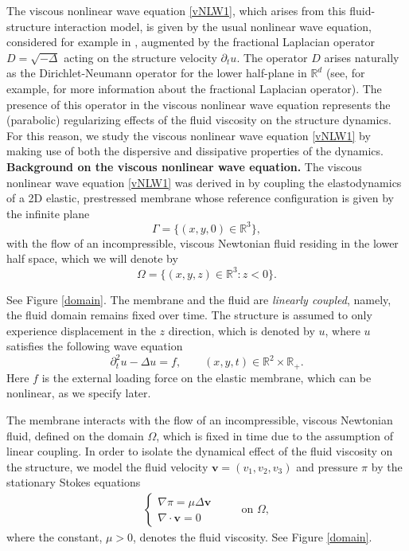 \documentclass[letterpaper, 11pt,  reqno]{amsart}
\newcommand{\1}{\hspace{0.5mm}\text{I}\hspace{0.2mm}}
\newcommand{\noi}{\noindent}
\numberwithin{equation}{section}
\numberwithin{theorem}{section}
\begin{document}
The viscous nonlinear wave equation \eqref{vNLW1}, which arises from this fluid-structure interaction model, is given by the usual nonlinear wave equation, considered for example in \cite{TAO}, augmented by the fractional Laplacian operator $D = \sqrt{-\Delta}$ acting on the structure velocity $\partial_{t}u$. The operator $D$ arises naturally as the Dirichlet-Neumann operator for the lower half-plane in $\mathbb{R}^{d}$ (see, for example, \cite{CS} for more information about the fractional Laplacian operator). The presence of this operator in the viscous nonlinear wave equation represents 
the (parabolic) regularizing effects of the fluid viscosity on the structure dynamics. 
For this reason, we study  the viscous nonlinear wave equation \eqref{vNLW1}
by making use of both the dispersive and dissipative properties
of the dynamics.
\fi
%
{\bf{Background on the viscous nonlinear wave equation.}} The viscous nonlinear wave equation \eqref{vNLW1} was derived in \cite{KC} by coupling the elastodynamics of a 2D elastic, prestressed membrane 
whose reference configuration is given by the infinite plane
\begin{equation*}
\Gamma = \{(x, y, 0) \in \mathbb{R}^{3}\},
\end{equation*}
with the flow of an incompressible, viscous Newtonian fluid residing in the lower half space, which we will denote by
\begin{equation*}
\Omega = \{(x, y, z) \in \mathbb{R}^{3} : z < 0\}.
\end{equation*}


\noi
See Figure \ref{domain}.
The membrane and the fluid are \textit{linearly coupled}, namely, the fluid domain remains fixed over time. 
The structure is assumed to only experience displacement in the $z$ direction, which is denoted by $u$,
where $u$ satisfies the following wave equation 
\begin{equation}\label{wave}
\partial_{t}^{2}u - \Delta u = f, \qquad (x, y, t) \in \mathbb{R}^{2} \times \mathbb{R}_{+}.
\end{equation}
Here $f$ is the external loading force on the elastic membrane, which can be nonlinear, as we specify later.

The membrane interacts with the flow of  an incompressible, viscous Newtonian fluid,
defined on the domain $\Omega$, which is fixed in time due to the assumption of linear coupling. 
In order to isolate the dynamical effect of the fluid viscosity on the structure, we model the fluid velocity $\boldsymbol{v} = (v_1, v_2, v_3)$ and pressure $\pi$ by the stationary Stokes equations 
\begin{align}\label{stokes}
\begin{cases}
\nabla \pi = \mu \Delta \boldsymbol{v} \\
\nabla \cdot \boldsymbol{v} = 0
\end{cases} \qquad \text{ on } \Omega,
\end{align}
where the constant, $\mu > 0$, denotes the fluid viscosity. See Figure \ref{domain}.
\end{document}
